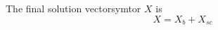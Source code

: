 \documentclass [10pt,letterpaper]{article}
\newcommand{\unitvectorsym}[1]{\hat{\vectorsym{#1}}}
\begin{document}
The final solution vectorsymtor $X$ is
\begin{equation} \label{eq:X-Xb-Xsc}
	X=X_b+X_{sc}
\end{equation}


\end{document}
